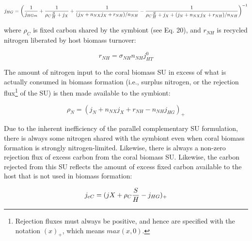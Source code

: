 \documentclass[]{elsarticle} %
\begin{document}
\begin{equation} j_{HG} = \bigg({1 \over j_{HGm}} + {1 \over {\rho_C{S \over H} + j_X}} + {1 \over {(j_N + n_{NX}j_X + r_{NH}) / n_{NH}}} - {1 \over {{\rho_C{S \over H} + j_X} + (j_N + n_{NX}j_X + r_{NH}) / n_{NH}}}\bigg)^{-1} \end{equation}

where \(\rho_C\) is fixed carbon shared by the symbiont (see Eq. 20),
and \(r_{NH}\) is recycled nitrogen liberated by host biomass turnover:

\begin{equation} r_{NH}=\sigma_{NH}n_{NH}j_{HT}^0 \end{equation}

The amount of nitrogen input to the coral biomass SU in excess of what
is actually consumed in biomass formation (i.e., surplus nitrogen, or
the rejection flux\footnote{Rejection fluxes must always be positive,
  and hence are specified with the notation \((x)_+\), which means
  \(max(x, 0)\).} of the SU) is then made available to the symbiont:

\begin{equation} \rho_N = (j_N + n_{NX}j_X + r_{NH} - n_{NH}j_{HG})_+ \end{equation}

Due to the inherent inefficiency of the parallel complementary SU
formulation, there is always some nitrogen shared with the symbiont even
when coral biomass formation is strongly nitrogen-limited. Likewise,
there is always a non-zero rejection flux of excess carbon from the
coral biomass SU. Likewise, the carbon rejected from this SU reflects
the amount of excess fixed carbon available to the host that is not used
in biomass formation:

\begin{equation} j_{eC} = (jX + \rho_C{S \over H} - j_{HG})_+ \end{equation}
\end{document}
